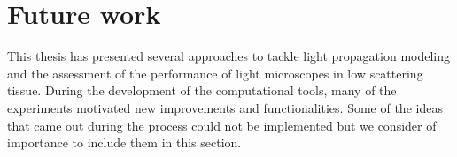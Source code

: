 \chapter*{Future work}

This thesis has presented several approaches to tackle light propagation modeling and the assessment of the performance of light microscopes in low scattering tissue. During the development of the computational tools, many of the experiments motivated new improvements and functionalities. Some of the ideas that came out during the process could not be implemented but we consider of importance to include them in this section.

